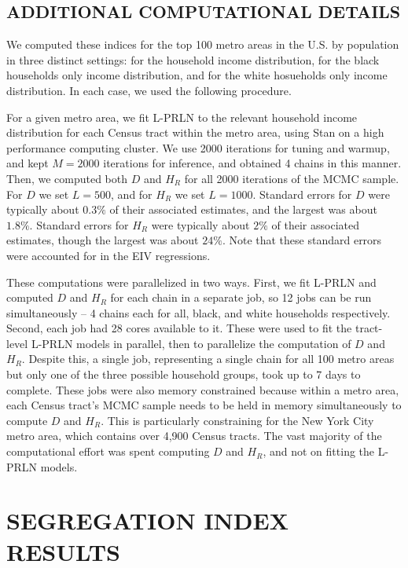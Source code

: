 \documentclass[12pt]{article}
\begin{document}
\subsection{ADDITIONAL COMPUTATIONAL DETAILS}
We computed these indices for the top 100 metro areas in the U.S. by population in three distinct settings: for the household income distribution, for the black households only income distribution, and for the white hosueholds only income distribution. In each case, we used the following procedure.

For a given metro area, we fit L-PRLN to the relevant household income distribution for each Census tract within the metro area, using Stan \citep{stan2017manual} on a high performance computing cluster. We use 2000 iterations for tuning and warmup, and kept $M=2000$ iterations for inference, and obtained 4 chains in this manner. Then, we computed both $D$ and $H_R$ for all 2000 iterations of the MCMC sample. For $D$ we set $L=500$, and for $H_R$ we set $L=1000$. Standard errors for $D$ were typically about $0.3\%$ of their associated estimates, and the largest was about $1.8\%$. Standard errors for $H_R$ were typically about $2\%$ of their associated estimates, though the largest was about $24\%$. Note that these standard errors were accounted for in the EIV regressions.

These computations were parallelized in two ways. First, we fit L-PRLN and computed $D$ and $H_R$ for each chain in a separate job, so 12 jobs can be run simultaneously -- 4 chains each for all, black, and white households respectively. Second, each job had 28 cores available to it. These were used to fit the tract-level L-PRLN models in parallel, then to parallelize the computation of $D$ and $H_R$. Despite this, a single job, representing a single chain for all 100 metro areas but only one of the three possible household groups, took up to 7 days to complete. These jobs were also memory constrained because within a metro area, each Census tract's MCMC sample needs to be held in memory simultaneously to compute $D$ and $H_R$. This is particularly constraining for the New York City metro area, which contains over 4,900 Census tracts. The vast majority of the computational effort was spent computing $D$ and $H_R$, and not on fitting the L-PRLN models.

\section{SEGREGATION INDEX RESULTS}\label{app:eiv.results}
\setcounter{table}{0}
\end{document}
